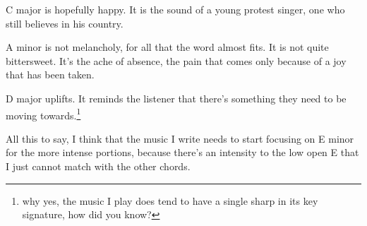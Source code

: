 \documentclass[12pt]{article}[titlepage]
\newcommand{\1}{\={a}}
\newcommand{\2}{\={e}}
\newcommand{\3}{\={\i}}
\newcommand{\4}{\=o}
\newcommand{\5}{\=u}
\newcommand{\6}{\={A}}
\renewcommand{\,}{\textsuperscript{,}}
\begin{document}
C major is hopefully happy.
It is the sound of a young protest singer, one who still believes in his country.

A minor is not melancholy, for all that the word almost fits.
It is not quite bittersweet.
It's the ache of absence, the pain that comes only because of a joy that has been taken.

D major uplifts.
It reminds the listener that there's something they need to be moving towards.\footnote{why yes, the music I play does tend to have a single sharp in its key signature, how did you know?}

All this to say, I think that the music I write needs to start focusing on E minor for the more intense portions, because there's an intensity to the low open E that I just cannot match with the other chords.
\end{document}

